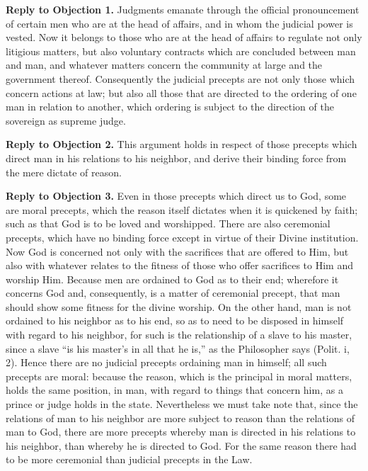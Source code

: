 \textbf{Reply to Objection 1.} Judgments emanate through the official pronouncement of certain men who are at the head of affairs, and in whom the judicial power is vested. Now it belongs to those who are at the head of affairs to regulate not only litigious matters, but also voluntary contracts which are concluded between man and man, and whatever matters concern the community at large and the government thereof. Consequently the judicial precepts are not only those which concern actions at law; but also all those that are directed to the ordering of one man in relation to another, which ordering is subject to the direction of the sovereign as supreme judge.

\textbf{Reply to Objection 2.} This argument holds in respect of those precepts which direct man in his relations to his neighbor, and derive their binding force from the mere dictate of reason.

\textbf{Reply to Objection 3.} Even in those precepts which direct us to God, some are moral precepts, which the reason itself dictates when it is quickened by faith; such as that God is to be loved and worshipped. There are also ceremonial precepts, which have no binding force except in virtue of their Divine institution. Now God is concerned not only with the sacrifices that are offered to Him, but also with whatever relates to the fitness of those who offer sacrifices to Him and worship Him. Because men are ordained to God as to their end; wherefore it concerns God and, consequently, is a matter of ceremonial precept, that man should show some fitness for the divine worship. On the other hand, man is not ordained to his neighbor as to his end, so as to need to be disposed in himself with regard to his neighbor, for such is the relationship of a slave to his master, since a slave ``is his master's in all that he is,'' as the Philosopher says (Polit. i, 2). Hence there are no judicial precepts ordaining man in himself; all such precepts are moral: because the reason, which is the principal in moral matters, holds the same position, in man, with regard to things that concern him, as a prince or judge holds in the state. Nevertheless we must take note that, since the relations of man to his neighbor are more subject to reason than the relations of man to God, there are more precepts whereby man is directed in his relations to his neighbor, than whereby he is directed to God. For the same reason there had to be more ceremonial than judicial precepts in the Law.


